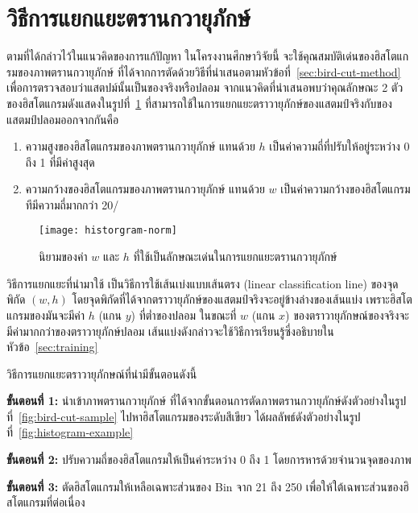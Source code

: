\section{วิธีการแยกแยะตรานกวายุภักษ์}
\label{sec:classification}
ตามที่ได้กล่าวไว้ในแนวคิดของการแก้ปัญหา ในโครงงานศึกษาวิจัยนี้  จะใช้คุณสมบัติเด่นของฮิสโตแกรมของภาพตรานกวายุภักษ์ ที่ได้จากการตัดด้วยวิธีที่นำเสนอตามหัวข้อที่~\ref{sec:bird-cut-method} เพื่อการตรวจสอบว่าแสตปม์นั้นเป็นของจริงหรือปลอม จากแนวคิดที่นำเสนอพบว่าคุณลักษณะ 2 ตัวของฮิสโตแกรมดังแสดงในรูปที่~\ref{fig:feature-def} ที่สามารถใช้ในการแยกแยะตราวายุภักษ์ของแสตมป์จริงกับของแสตมป์ปลอมออกจากกันคือ
\begin{enumerate}
\item ความสูงของฮิสโตแกรมของภาพตรานกวายุภักษ์ แทนด้วย $h$ เป็นค่าความถี่ที่ปรับให้อยู่ระหว่าง 0 ถึง 1 ที่มีค่าสูงสุด
\item ความกว้างของฮิสโตแกรมของภาพตรานกวายุภักษ์ แทนด้วย $w$ เป็นค่าความกว้างของฮิสโตแกรมทีมีความถี่มากกว่า 20/
\end{enumerate}

\begin{figure}[!ht]
\centering
\vspace{2em}
\texttt{[image: historgram-norm]}
\vspace{2em}
\caption{นิยามของค่า $w$ และ $h$  ที่ใช้เป็นลักษณะเด่นในการแยกแยะตรานกวายุภักษ์}
\label{fig:feature-def}
\end{figure}

วิธีการแยกแยะที่นำมาใช้ เป็นวิธีการใช้เส้นเบ่งแบบเส้นตรง (linear classification line) ของจุดพิกัด $(w,h)$ โดยจุดพิกัดที่ได้จากตราวายุภักษ์ของแสตมป์จริงจะอยู่ข้างล่างของเส้นแบ่ง เพราะฮิสโตแกรมของมันจะมีค่า $h$  (แกน $y$) ที่ต่ำของปลอม ในขณะที่ $w$ (แกน $x$) ของตราวายุภักษณ์ของจริงจะมีค่ามากกว่าของตราวายุภักษ์ปลอม  เส้นแบ่งดังกล่าวจะใช้วิธีการเรียนรู้ซี่งอธิบายในหัวข้อ~\ref{sec:training} 

วิธีการแยกแยะตราวายุภักษณ์ที่นำมีขั้นตอนดังนี้

\textbf{ขั้นตอนที่ 1:} นำเข้าภาพตรานกวายุภักษ์ ที่ได้จากขั้นตอนการตัดภาพตรานกวายุภักษ์ดังตัวอย่างในรูปที่~\ref{fig:bird-cut-sample} ไปหาฮิสโตแกรมของระดับสีเขียว ได้ผลลัพธ์ดังตัวอย่างในรูปที่~\ref{fig:histogram-example}

\textbf{ขั้นตอนที่ 2:} ปรับความถี่ของฮิสโตแกรมให้เป็นค่าระหว่าง 0 ถึง 1 โดยการหารด้วยจำนวนจุดของภาพ

\textbf{ขั้นตอนที่  3:} ตัดฮิสโตแกรมให้เหลือเฉพาะส่วนของ Bin  จาก 21 ถึง 250 เพื่อให้ใต้เฉพาะส่วนของฮิสโตแกรมที่ต่อเนื่อง 

